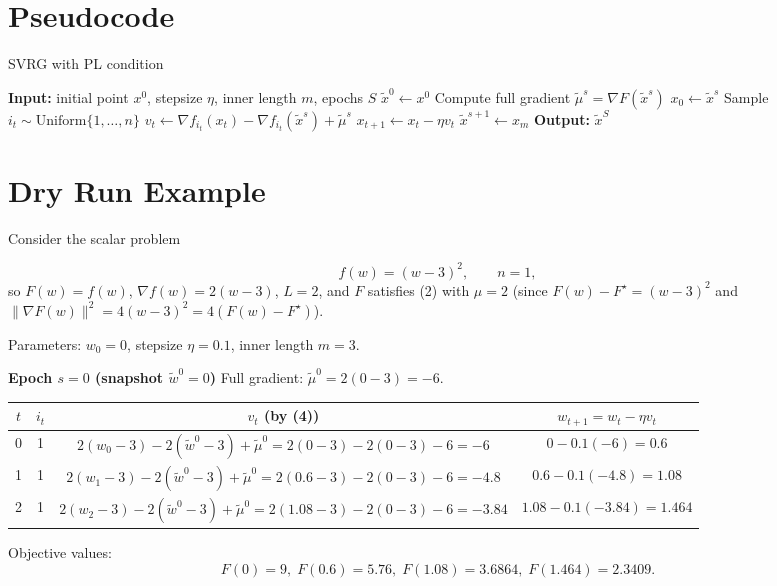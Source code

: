\documentclass{article}
\begin{document}
\section*{Pseudocode}
\begin{algorithm}[H]
\caption{SVRG with PL condition}
\begin{algorithmic}[1]
\State \textbf{Input:} initial point $x^{0}$, stepsize $\eta$, inner length $m$, epochs $S$
\State $\tilde{x}^{0}\gets x^{0}$
    \State Compute full gradient $\tilde{\mu}^{s}= \nabla F(\tilde{x}^{s})$
    \State $x_{0}\gets \tilde{x}^{s}$
        \State Sample $i_t\sim\text{Uniform}\{1,\dots,n\}$
        \State $v_t \gets \nabla f_{i_t}(x_t)-\nabla f_{i_t}(\tilde{x}^{s})+\tilde{\mu}^{s}$
        \State $x_{t+1}\gets x_t-\eta v_t$
    \EndFor
    \State $\tilde{x}^{s+1}\gets x_m$
\EndFor
\State \textbf{Output:} $\tilde{x}^{S}$
\end{algorithmic}
\end{algorithm}

\section*{Dry Run Example}
Consider the scalar problem  

\[
f(w)=(w-3)^{2},\qquad n=1,
\]
so $F(w)=f(w)$, $\nabla f(w)=2(w-3)$, $L=2$, and $F$ satisfies (2) with $\mu=2$ (since $F(w)-F^{\star}= (w-3)^{2}$ and $\|\nabla F(w)\|^{2}=4(w-3)^{2}=4(F(w)-F^{\star})$).

Parameters: $w_{0}=0$, stepsize $\eta=0.1$, inner length $m=3$.

\medskip
\textbf{Epoch $s=0$ (snapshot $\tilde w^{0}=0$)}  
Full gradient: $\tilde\mu^{0}=2(0-3)=-6$.

\begin{tabular}{c|c|c|c}
$t$ & $i_t$ & $v_t$ (by (4)) & $w_{t+1}=w_t-\eta v_t$\\ \hline
0 & 1 & $2(w_0-3)-2(\tilde w^{0}-3)+\tilde\mu^{0}=2(0-3)-2(0-3)-6=-6$ & $0-0.1(-6)=0.6$\\
1 & 1 & $2(w_1-3)-2(\tilde w^{0}-3)+\tilde\mu^{0}=2(0.6-3)-2(0-3)-6=-4.8$ & $0.6-0.1(-4.8)=1.08$\\
2 & 1 & $2(w_2-3)-2(\tilde w^{0}-3)+\tilde\mu^{0}=2(1.08-3)-2(0-3)-6=-3.84$ & $1.08-0.1(-3.84)=1.464$\\
\end{tabular}

Objective values:
\[
F(0)=9,\;F(0.6)=5.76,\;F(1.08)=3.6864,\;F(1.464)=2.3409.
\]
\end{document}
